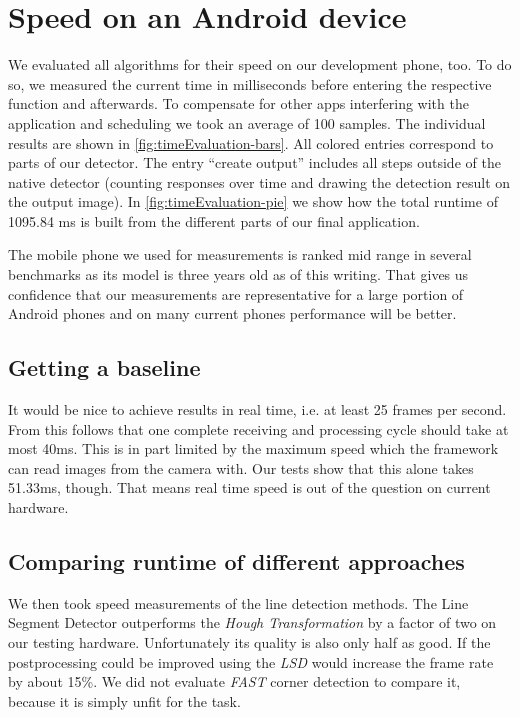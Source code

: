 	\section{Speed on an Android device}
	\label{evaluation-speed}
	We evaluated all algorithms for their speed on our development phone, too. To do so, we measured the current time in milliseconds before entering the respective function and afterwards. To compensate for other apps interfering with the application and scheduling we took an average of 100 samples. The individual results are shown in \autoref{fig:timeEvaluation-bars}. All colored entries correspond to parts of our detector. The entry ``create output'' includes all steps outside of the native detector (counting responses over time and drawing the detection result on the output image). In \autoref{fig:timeEvaluation-pie} we show how the total runtime of 1095.84 ms is built from the different parts of our final application.

	The mobile phone we used for measurements is ranked mid range in several benchmarks \cite{antutuBench,primateBench} as its model is three years old as of this writing. That gives us confidence that our measurements are representative for a large portion of Android phones and on many current phones performance will be better.

	\subsection{Getting a baseline}
	\label{evaluation-speed-baseline}
	It would be nice to achieve results in real time, i.e. at least 25 frames per second. From this follows that one complete receiving and processing cycle should take at most 40ms. This is in part limited by the maximum speed which the framework can read images from the camera with. Our tests show that this alone takes 51.33ms, though. That means real time speed is out of the question on current hardware.

	\subsection{Comparing runtime of different approaches}
	\label{evaluation-speed-approaches}
	We then took speed measurements of the line detection methods. The Line Segment Detector outperforms the \emph{Hough Transformation} by a factor of two on our testing hardware. Unfortunately its quality is also only half as good. If the postprocessing could be improved using the \emph{LSD} would increase the frame rate by about 15\%. We did not evaluate \emph{FAST} corner detection to compare it, because it is simply unfit for the task.

